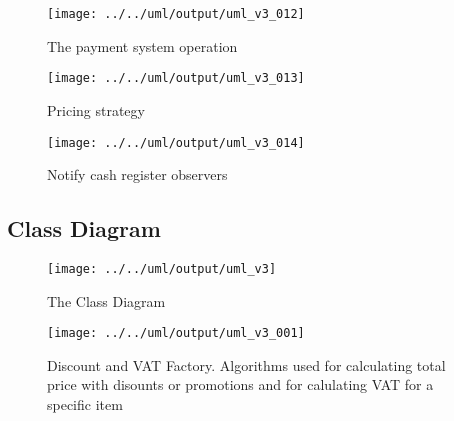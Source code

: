 \documentclass[a4paper]{scrreprt}
\begin{document}
\begin{figure}[H]
    \begin{center}
        \texttt{[image: ../../uml/output/uml\_v3\_012]}
        \caption{The payment system operation}
        \label{fig:pay}
    \end{center}
\end{figure}

\begin{figure}[H]
    \begin{center}
        \texttt{[image: ../../uml/output/uml\_v3\_013]}
        \caption{Pricing strategy}
        \label{fig:pricing}
    \end{center}
\end{figure}

\begin{figure}[H]
    \begin{center}
        \texttt{[image: ../../uml/output/uml\_v3\_014]}
        \caption{Notify cash register observers}
        \label{fig:notify-cashregister-observer}
    \end{center}
\end{figure}

\newpage
\subsection*{Class Diagram}
\begin{figure}[H]
    \begin{center}
        \texttt{[image: ../../uml/output/uml\_v3]}
        \caption{The Class Diagram}
        \label{fig:CD}
    \end{center}
\end{figure}

\begin{figure}[H]
    \begin{center}
        \texttt{[image: ../../uml/output/uml\_v3\_001]}
        \caption{Discount and VAT Factory.
        Algorithms used for calculating total price with
        disounts or promotions and for
        calulating VAT for a specific item}
        \label{fig:discount-vat-factories}
    \end{center}
\end{figure}
\end{document}
